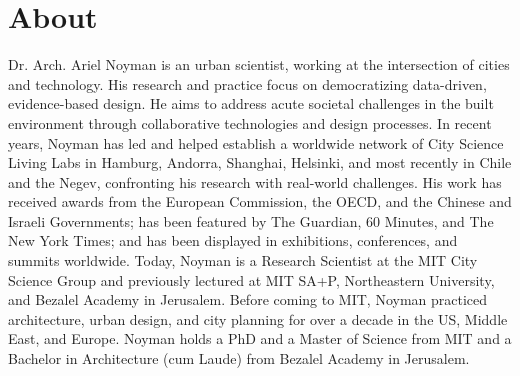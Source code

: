 \section*{About}

 {
Dr. Arch. Ariel Noyman is an urban scientist, working at the intersection of cities and technology. His research and practice focus on democratizing data-driven, evidence-based design. He aims to address acute societal challenges in the built environment through collaborative technologies and design processes. In recent years, Noyman has led and helped establish a worldwide network of City Science Living Labs in Hamburg, Andorra, Shanghai, Helsinki, and most recently in Chile and the Negev, confronting his research with real-world challenges. His work has received awards from the European Commission, the OECD, and the Chinese and Israeli Governments; has been featured by The Guardian, 60 Minutes, and The New York Times; and has been displayed in exhibitions, conferences, and summits worldwide. Today, Noyman is a Research Scientist at the MIT City Science Group and previously lectured at MIT SA+P, Northeastern University, and Bezalel Academy in Jerusalem. Before coming to MIT, Noyman practiced architecture, urban design, and city planning for over a decade in the US, Middle East, and Europe. Noyman holds a PhD and a Master of Science from MIT and a Bachelor in Architecture (cum Laude) from Bezalel Academy in Jerusalem.
 }

